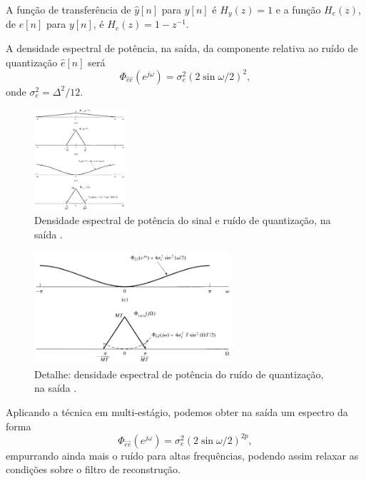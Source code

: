 \begin{frame}[allowframebreaks]
  \framebreak

  A função de transferência de $\hat{y}[n]$ para $y[n]$ é $H_y(z)=1$ e
  a função $H_e(z)$, de $e[n]$ para $y[n]$, é $H_e(z) = 1 - z^{-1}$.
  
  A densidade espectral de potência, na saída, da componente relativa ao ruído de quantização $\hat{e}[n]$ será
  \begin{equation}
  \Phi_{\hat{e}\hat{e}} (e^{j\omega}) = \sigma_e^2 (2 \sin \omega / 2)^2 ,
  \end{equation}
  onde $\sigma_e^2 = \Delta^2 / 12$.

  \framebreak

  \begin{figure}[h!]
  \centering
  \includegraphics[width=0.3\textwidth]{images/oppenheim_fig470.png}
  \caption{Densidade espectral de potência do sinal e ruído de quantização, na saída \citep{oppenheim2009}.}
  \label{fig:oppenheim_fig470}
  \end{figure}

  \framebreak

  \begin{figure}[h!]
  \centering
  \includegraphics[width=0.65\textwidth]{images/oppenheim_fig470cd.png}
  \caption{Detalhe: densidade espectral de potência do ruído de quantização, na saída \citep{oppenheim2009}.}
  \label{fig:oppenheim_fig470}
  \end{figure}

  \framebreak

  Aplicando a técnica em multi-estágio, podemos obter na saída um espectro da forma
  \begin{equation}
  \Phi_{\hat{e}\hat{e}} (e^{j\omega}) = \sigma_e^{2} (2 \sin \omega /2)^{2p},
  \end{equation}
  empurrando ainda mais o ruído para altas frequências, podendo assim relaxar 
  as condições sobre o filtro de reconstrução.

\end{frame}


